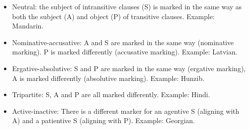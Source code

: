 \begin{itemize}
\item Neutral: the subject of intransitive clauses (S) is marked in the same way as both the subject (A) and object (P) of transitive clauses. Example: Mandarin.
\item Nominative-accusative: A and S are marked in the same way (nominative marking). P is marked differently (accusative marking). Example: Latvian.
\item Ergative-absolutive: S and P are marked in the same way (ergative marking), A is marked differently (absolutive marking). Example: Hunzib.
\item Tripartite: S, A and P are all marked differently. Example: Hindi.
\item Active-inactive: There is a different marker for an agentive S (aligning with A) and a patientive S (aligning with P). Example: Georgian. 
\end{itemize}

